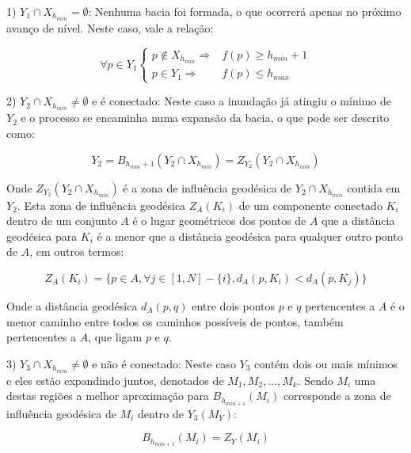 1) $ Y_1 \cap X_{h_{min}} = \emptyset $: Nenhuma bacia foi formada, o que ocorrerá
apenas no próximo avanço de nível. Neste caso, vale a relação:

\begin{equation}\label{eq:watershed_caso1}
  \forall p \in Y_1 \left\{
    \begin{array}{rc}
      p \notin X_{h_{min}} \Rightarrow & f(p) \ge h_{min} + 1 \\
                 p \in Y_1 \Rightarrow & f(p) \le h_{max}
    \end{array}
  \right.
\end{equation}

2) $ Y_2 \cap X_{h_{min}} \neq \emptyset $ e é conectado: Neste caso a inundação já atingiu o
mínimo de $ Y_2 $ e o processo se encaminha numa expansão da bacia, o que pode
ser descrito como:

\begin{equation}\label{eq:watershed_caso21}
  Y_2 = B_{h_{min} + 1}(Y_2 \cap X_{h_{min}}) = Z_{Y_2}(Y_2 \cap X_{h_{min}})
\end{equation}

Onde $ Z_{Y_2}(Y_2 \cap X_{h_{min}}) $ é a zona de influência geodésica de
$ Y_2 \cap X_{h_{min}} $ contida em $ Y_2 $. Esta zona de influência
geodésica $ Z_A(K_i) $ de um componente conectado $ K_i $ dentro de um conjunto $ A $
é o lugar geométricos dos pontos
de $ A $ que a distância geodésica para $ K_i $ é a menor que a distância
geodésica para qualquer outro ponto de $ A $, em outros termos:

\begin{equation}\label{eq:watershed_caso22}
  Z_A(K_i) = \{ p \in A, \forall j \in [1, N] - \{ i \}, d_A(p, K_i) < d_A(p, K_j) \}
\end{equation}

Onde a distância geodésica $ d_A(p, q) $ entre dois pontos $ p $ e $ q $
pertencentes a $ A $ é o menor caminho entre todos os caminhos possíveis de
pontos, também pertencentes a $ A $, que ligam $ p $ e $ q $.

3) $ Y_3 \cap X_{h_{min}} \neq \emptyset $ e não é conectado: Neste caso $ Y_3 $
contém dois ou mais mínimos e eles estão expandindo juntos, denotados de
$ M_1, M_2, …, M_k $. Sendo $ M_i $ uma destas regiões a melhor aproximação
para $ B_{h_{min + 1}}(M_i) $ corresponde a zona de influência geodésica de $ M_i $
dentro de $ Y_3(M_Y)$:

\begin{equation}\label{eq:watershed_caso3}
  B_{h_{min + 1}}(M_i) = Z_Y(M_i)
\end{equation}


